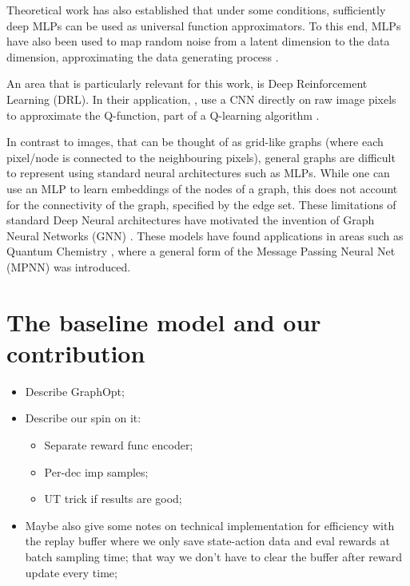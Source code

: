 \documentclass{report}
\numberwithin{equation}{section}
\numberwithin{figure}{section}
\numberwithin{table}{section}
\numberwithin{algorithm}{section}
\begin{document}
Theoretical work \citep{UnivApproxNN} has also established
that under some conditions, sufficiently deep MLPs 
can be used as universal function approximators. To this end, 
MLPs have also been used to map random noise from a latent 
dimension to the data dimension, approximating 
the data generating process \citep{goodfellow2014generative,VAEs}.

An area that is particularly relevant for this work, 
is Deep Reinforcement Learning 
(DRL). In their application, \cite{DQN}, use a CNN directly on 
raw image pixels to approximate the Q-function, part of a 
Q-learning algorithm \citep{QlearningWatkins1992}. 

In contrast to images, that can be thought of as grid-like graphs 
(where each pixel/node is connected to the neighbouring pixels), 
general graphs are difficult to represent using standard 
neural architectures such as MLPs. While one can use an MLP 
to learn embeddings of the nodes of a graph, this does not 
account for the connectivity of the graph, specified by the edge set. 
These limitations of standard Deep Neural architectures 
have motivated the invention of Graph Neural Networks (GNN) \citep{ScarselliGNN}. 
These models have found applications in areas such as 
Quantum Chemistry \citep{MPNNs}, where 
a general form of the Message Passing Neural Net (MPNN) was 
introduced.



\chapter{The baseline model and our contribution}\label{chap:contribution}
\begin{itemize}
  \item Describe GraphOpt;
  \item Describe our spin on it:
  \begin{itemize}
    \item Separate reward func encoder;
    \item Per-dec imp samples;
    \item UT trick if results are good;
  \end{itemize}
  \item Maybe also give some notes on technical 
  implementation for efficiency with the replay buffer 
  where we only save state-action data and eval rewards 
  at batch sampling time; that way we don't have to clear the 
  buffer after reward update every time;
\end{itemize}
\end{document}
